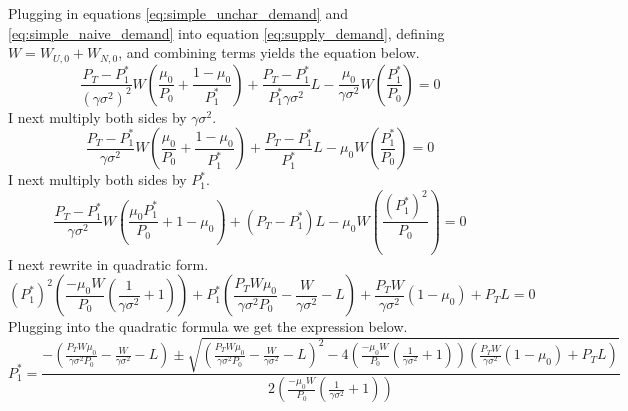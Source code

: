 \documentclass[12pt]{article}
\begin{document}
Plugging in equations \eqref{eq:simple_unchar_demand} and \eqref{eq:simple_naive_demand} into equation \eqref{eq:supply_demand}, defining $W=W_{U,0}+W_{N,0}$, and combining terms yields the equation below.
\begin{equation}
    \frac{P_T-P_1^*}{(\gamma\sigma^2)^2}W\left(\frac{\mu_0}{P_0} + \frac{1-\mu_0}{P_1^*}\right) + \frac{P_T-P_1^*}{P_1^*\gamma\sigma^2}L - \frac{\mu_0}{\gamma\sigma^2}W\left(\frac{P_1^*}{P_0}\right) = 0
\end{equation}
I next multiply both sides by $\gamma\sigma^2$.
\begin{equation}
    \frac{P_T-P_1^*}{\gamma\sigma^2}W\left(\frac{\mu_0}{P_0} + \frac{1-\mu_0}{P_1^*}\right) + \frac{P_T-P_1^*}{P_1^*}L - \mu_0 W\left(\frac{P_1^*}{P_0}\right) = 0
\end{equation}
I next multiply both sides by $P_1^*$.
\begin{equation}
    \frac{P_T-P_1^*}{\gamma\sigma^2}W\left(\frac{\mu_0 P_1^*}{P_0} + 1-\mu_0\right) + (P_T-P_1^*)L - \mu_0 W\left(\frac{(P_1^*)^2}{P_0}\right) = 0
\end{equation}
I next rewrite in quadratic form.
\begin{equation}
(P_1^*)^2\left(\frac{-\mu_0W}{P_0}\left(\frac{1}{\gamma\sigma^2}+1\right)\right) + P_1^*\left(\frac{P_TW\mu_0}{\gamma\sigma^2P_0}-\frac{W}{\gamma\sigma^2}-L\right) + \frac{P_TW}{\gamma\sigma^2}\left(1-\mu_0\right) + P_TL= 0
\end{equation}
Plugging into the quadratic formula we get the expression below.
\begin{equation}
P_1^*= \frac{-\left(\frac{P_TW\mu_0}{\gamma\sigma^2P_0}-\frac{W}{\gamma\sigma^2}-L\right) \pm \sqrt{\left(\frac{P_TW\mu_0}{\gamma\sigma^2P_0}-\frac{W}{\gamma\sigma^2}-L\right)^2 - 4\left(\frac{-\mu_0W}{P_0}\left(\frac{1}{\gamma\sigma^2}+1\right)\right) \left(\frac{P_TW}{\gamma\sigma^2}\left(1-\mu_0\right) + P_TL\right)}}{2\left(\frac{-\mu_0W}{P_0}\left(\frac{1}{\gamma\sigma^2}+1\right)\right)}
\end{equation}


\end{document}
